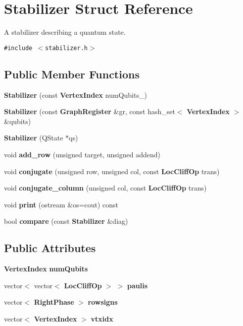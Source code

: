 \section{Stabilizer Struct Reference}
\label{structStabilizer}
A stabilizer describing a quantum state.  


{\tt \#include $<$stabilizer.h$>$}

\subsection*{Public Member Functions}
\begin{CompactItemize}
\item 
{\bf Stabilizer} (const  {\bf Vertex\-Index} num\-Qubits\_\-)\label{structStabilizer_a0}

\item 
{\bf Stabilizer} (const  {\bf Graph\-Register} \&gr, const  hash\_\-set$<$ {\bf Vertex\-Index} $>$ \&qubits)\label{structStabilizer_a1}

\item 
{\bf Stabilizer} (QState $\ast$qs)\label{structStabilizer_a2}

\item 
void {\bf add\_\-row} (unsigned target, unsigned addend)\label{structStabilizer_a3}

\item 
void {\bf conjugate} (unsigned row, unsigned col, const  {\bf Loc\-Cliff\-Op} trans)\label{structStabilizer_a4}

\item 
void {\bf conjugate\_\-column} (unsigned col, const  {\bf Loc\-Cliff\-Op} trans)\label{structStabilizer_a5}

\item 
void {\bf print} (ostream \&os=cout) const \label{structStabilizer_a6}

\item 
bool {\bf compare} (const  {\bf Stabilizer} \&diag)\label{structStabilizer_a7}

\end{CompactItemize}
\subsection*{Public Attributes}
\begin{CompactItemize}
\item 
{\bf Vertex\-Index} {\bf num\-Qubits}\label{structStabilizer_o0}

\item 
vector$<$ vector$<$ {\bf Loc\-Cliff\-Op} $>$ $>$ {\bf paulis}\label{structStabilizer_o1}

\item 
vector$<$ {\bf Right\-Phase} $>$ {\bf rowsigns}\label{structStabilizer_o2}

\item 
vector$<$ {\bf Vertex\-Index} $>$ {\bf vtxidx}\label{structStabilizer_o3}

\end{CompactItemize}


